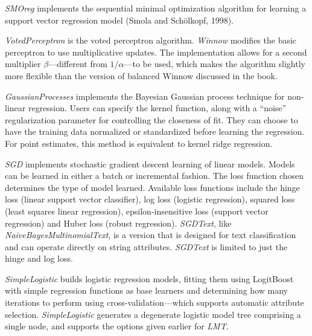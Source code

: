 \textit{SMOreg} implements the sequential minimal optimization algorithm for
learning a support vector regression model (Smola and Schölkopf,
1998).

\textit{VotedPerceptron} is the voted perceptron
algorithm. \textit{Winnow} modifies the basic perceptron to use
multiplicative updates. The implementation allows for a second
multiplier $\beta$---different from $1/\alpha$---to be used, which
makes the algorithm slightly more flexible than the version of
balanced Winnow discussed in the book.

\textit{GaussianProcesses} implements the Bayesian Gaussian process
technique for non-linear regression. Users can specify the kernel
function, along with a ``noise'' regularization parameter for
controlling the closeness of fit. They can choose to have the training
data normalized or standardized before learning the regression. For
point estimates, this method is equivalent to kernel ridge regression.

\textit{SGD} implements stochastic gradient descent learning of linear
models. Models can be learned in either a batch or incremental
fashion. The loss function chosen determines the type of model
learned. Available loss functions include the hinge loss (linear
support vector classifier), log loss (logistic regression), squared
loss (least squares linear regression), epsilon-insensitive loss
(support vector regression) and Huber loss (robust
regression). \textit{SGDText}, like
\textit{NaiveBayesMultinomialText}, is a version that is designed for
text classification and can operate directly on string
attributes. \textit{SGDText} is limited to just the hinge and log
loss.

\textit{SimpleLogistic} builds logistic regression models, fitting
them using LogitBoost with simple regression functions as base
learners and determining how many iterations to perform using
cross-validation---which supports automatic attribute
selection. \textit{SimpleLogistic} generates a degenerate logistic
model tree comprising a single node, and supports the options given
earlier for \textit{LMT}.

